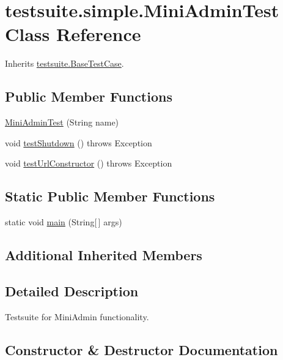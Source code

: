 \hypertarget{classtestsuite_1_1simple_1_1_mini_admin_test}{}\section{testsuite.\+simple.\+Mini\+Admin\+Test Class Reference}
\label{classtestsuite_1_1simple_1_1_mini_admin_test}


Inherits \mbox{\hyperlink{classtestsuite_1_1_base_test_case}{testsuite.\+Base\+Test\+Case}}.

\subsection*{Public Member Functions}
\begin{DoxyCompactItemize}
\item 
\mbox{\hyperlink{classtestsuite_1_1simple_1_1_mini_admin_test_a3a0ed00e5b6b2feb4b9a2102c94fac02}{Mini\+Admin\+Test}} (String name)
\item 
void \mbox{\hyperlink{classtestsuite_1_1simple_1_1_mini_admin_test_a8420a5f6bcd0ecfe1b716b8251899662}{test\+Shutdown}} ()  throws Exception 
\item 
void \mbox{\hyperlink{classtestsuite_1_1simple_1_1_mini_admin_test_ae7432a2cbcda8109289d6240fb07839c}{test\+Url\+Constructor}} ()  throws Exception 
\end{DoxyCompactItemize}
\subsection*{Static Public Member Functions}
\begin{DoxyCompactItemize}
\item 
static void \mbox{\hyperlink{classtestsuite_1_1simple_1_1_mini_admin_test_a8a37b0ac4e247a37872c7854f9a52ae7}{main}} (String\mbox{[}$\,$\mbox{]} args)
\end{DoxyCompactItemize}
\subsection*{Additional Inherited Members}


\subsection{Detailed Description}
Testsuite for Mini\+Admin functionality. 

\subsection{Constructor \& Destructor Documentation}
\mbox{\label{classtestsuite_1_1simple_1_1_mini_admin_test_a3a0ed00e5b6b2feb4b9a2102c94fac02}} 
